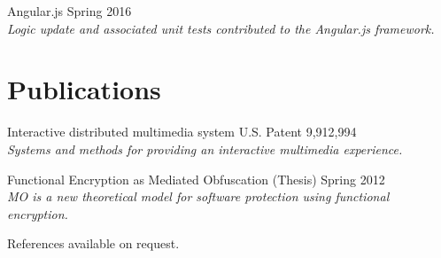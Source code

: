\documentclass[line,margin]{res}
\begin{document}
\begin{resume}
        Angular.js \hfill Spring 2016\\
            \emph{Logic update and associated unit tests contributed to the Angular.js framework.}
\section{\sc Publications}
        Interactive distributed multimedia system \hfill U.S. Patent 9,912,994\\
            \emph{Systems and methods for providing an interactive multimedia experience.}

        Functional Encryption as Mediated Obfuscation (Thesis) \hfill Spring 2012\\
            \emph{MO is a new theoretical model for software protection using functional encryption.}

References available on request.
\end{resume}
\end{document}

